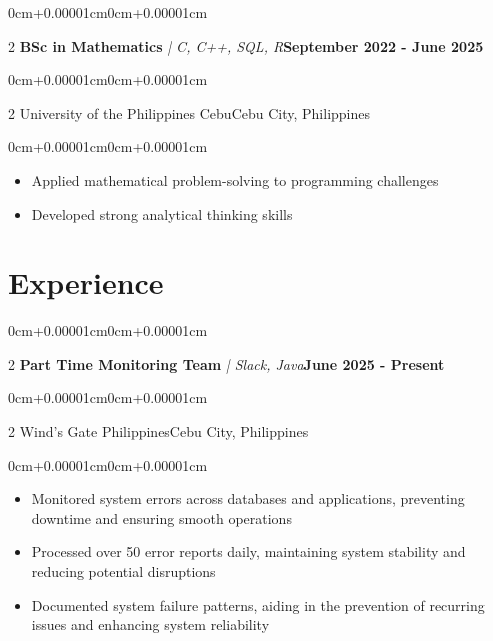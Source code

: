 \documentclass[10pt, letterpaper]{article}
\newenvironment{highlights}{\begin{itemize}[topsep=0.10cm,parsep=0.10cm,partopsep=0pt,itemsep=0pt,leftmargin=0cm+10pt]}{\end{itemize}}
\newenvironment{onecolentry}{\begin{adjustwidth}{0cm+0.00001cm}{0cm+0.00001cm}}{\end{adjustwidth}}
\newenvironment{twocolentry}[2][]{\onecolentry\def\secondColumn{#2}\setcolumnwidth{\fill,5cm}\begin{paracol}{2}}{\switchcolumn \raggedleft \secondColumn\end{paracol}\endonecolentry}
\begin{document}
    \begin{twocolentry}{\textbf{September 2022 - June 2025}}
    \textbf{BSc in Mathematics}\textit{ | C, C++, SQL, R}\end{twocolentry}
    \vspace{0.05cm}
    \begin{twocolentry}{Cebu City, Philippines}
    University of the Philippines Cebu\end{twocolentry}
    \vspace{0.10cm}
    \begin{onecolentry}
        \begin{highlights}
            \item Applied mathematical problem-solving to programming challenges
            \item Developed strong analytical thinking skills
        \end{highlights}
    \end{onecolentry}
    \vspace{0.15cm}

\section{Experience}

    \begin{twocolentry}{\textbf{June 2025 - Present}}
    \textbf{Part Time Monitoring Team}\textit{ | Slack, Java}\end{twocolentry}
    \vspace{0.05cm}
    \begin{twocolentry}{Cebu City, Philippines}
    Wind's Gate Philippines\end{twocolentry}
    \vspace{0.10cm}
    \begin{onecolentry}
        \begin{highlights}
            \item Monitored system errors across databases and applications, preventing downtime and ensuring smooth operations
            \item Processed over 50 error reports daily, maintaining system stability and reducing potential disruptions
            \item Documented system failure patterns, aiding in the prevention of recurring issues and enhancing system reliability
        \end{highlights}
    \end{onecolentry}
    \vspace{0.15cm}
\end{document}
